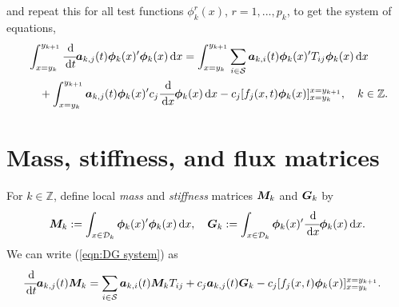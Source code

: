 and repeat this for all test functions \(\phi^r_k(x)\), \(r=1,...,p_k\), to get the system of equations,
\begin{align}
	\begin{multlined}[t]\int_{x=y_k}^{y_{k+1}}\cfrac{\wrt}{\wrt t} \boldsymbol a_{k,j}(t) \boldsymbol \phi_k(x)\tr{}\boldsymbol \phi_k(x)\wrt x = \int_{x=y_k}^{y_{k+1}}\sum_{i\in\calS} \boldsymbol a_{k,i}(t) \boldsymbol \phi_k(x)\tr{}T_{ij}\boldsymbol\phi_k (x)\wrt x  
	\\{}+  \int_{x=y_k}^{y_{k+1}}\boldsymbol a_{k,j}(t) \boldsymbol \phi_k(x)\tr{}c_j\cfrac{\wrt}{\wrt x}\boldsymbol\phi_k(x)\wrt x - c_j[f_j(x,t) \boldsymbol\phi_k(x)]_{x=y_k}^{x=y_{k+1}},\quad k\in\mathbb Z. \end{multlined} \label{eqn:DG system}
\end{align}

\section{Mass, stiffness, and flux matrices}
For \(k\in\mathbb Z\), define local \textit{mass} and \textit{stiffness} matrices \(\boldsymbol M_k\) and \(\boldsymbol G_k\) by 
\[\boldsymbol M_k := \int_{x\in\mathcal{D}_k}\boldsymbol \phi_k(x)'{}\boldsymbol \phi_k(x)\, \mathrm{d} x,\quad \boldsymbol G_k := \int_{x\in\mathcal{D}_k}\boldsymbol \phi_k(x)'{}\cfrac{\, \mathrm{d}}{\, \mathrm{d} x} \boldsymbol \phi_k(x)\, \mathrm{d} x.\]
We can write (\ref{eqn:DG system}) as 
\begin{align}
	&\cfrac{\, \mathrm{d}}{\, \mathrm{d} t} \boldsymbol a_{k,j}(t) \boldsymbol M_k = \sum_{i\in\mathcal{S}} \boldsymbol a_{k,i}(t)\boldsymbol M_kT_{ij} 
	+  c_j\boldsymbol a_{k,j}(t) \boldsymbol G_k - c_j[f_j(x,t)\boldsymbol\phi_k(x)]_{x=y_k}^{x=y_{k+1}}.\label{eqn:DG matrix}
\end{align}

